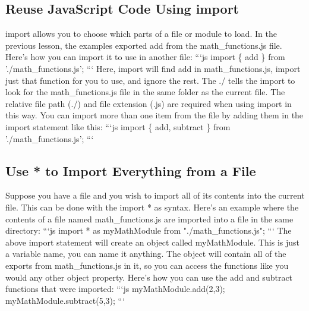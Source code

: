\documentclass{article}%
\begin{document}
%
\subsection{Reuse JavaScript Code Using import}%
\label{subsec:ReuseJavaScriptCodeUsingimport}%
import allows you to choose which parts of a file or module to load. In the previous lesson, the examples exported add from the math\_functions.js file. Here's how you can import it to use in another file:\newline%
```js\newline%
import \{ add \} from './math\_functions.js';\newline%
```\newline%
Here, import will find add in math\_functions.js, import just that function for you to use, and ignore the rest. The ./ tells the import to look for the math\_functions.js file in the same folder as the current file. The relative file path (./) and file extension (.js) are required when using import in this way.\newline%
You can import more than one item from the file by adding them in the import statement like this:\newline%
```js\newline%
import \{ add, subtract \} from './math\_functions.js';\newline%
```\newline%

%
\subsection{Use * to Import Everything from a File}%
\label{subsec:Use*toImportEverythingfromaFile}%
Suppose you have a file and you wish to import all of its contents into the current file. This can be done with the import * as syntax. Here's an example where the contents of a file named math\_functions.js are imported into a file in the same directory:\newline%
```js\newline%
import * as myMathModule from "./math\_functions.js";\newline%
```\newline%
The above import statement will create an object called myMathModule. This is just a variable name, you can name it anything. The object will contain all of the exports from math\_functions.js in it, so you can access the functions like you would any other object property. Here's how you can use the add and subtract functions that were imported:\newline%
```js\newline%
myMathModule.add(2,3);\newline%
myMathModule.subtract(5,3);\newline%
```\newline%
\end{document}
